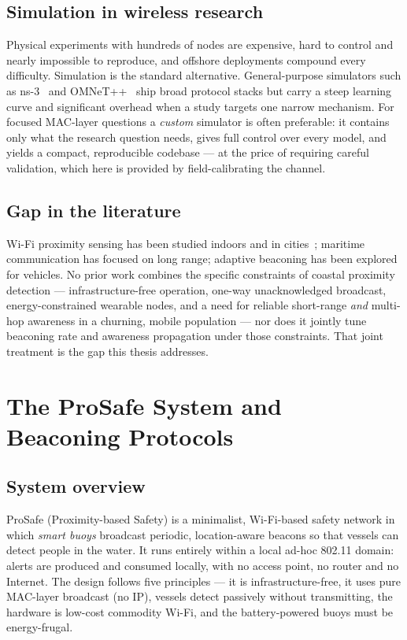 \documentclass[12pt,a4paper,oneside]{report}
\begin{document}
\section{Simulation in wireless research}
Physical experiments with hundreds of nodes are expensive, hard to control and
nearly impossible to reproduce, and offshore deployments compound every
difficulty. Simulation is the standard alternative. General-purpose simulators
such as ns-3~\cite{nsnam} and OMNeT++~\cite{omnetpp} ship broad protocol stacks
but carry a steep learning curve and significant overhead when a study targets
one narrow mechanism. For focused MAC-layer questions a \emph{custom} simulator
is often preferable: it contains only what the research question needs, gives
full control over every model, and yields a compact, reproducible codebase ---
at the price of requiring careful validation, which here is provided by
field-calibrating the channel.

\section{Gap in the literature}
Wi-Fi proximity sensing has been studied indoors and in cities~\cite{goel-wifi};
maritime communication has focused on long range; adaptive beaconing has been
explored for vehicles. No prior work combines the specific constraints of
coastal proximity detection --- infrastructure-free operation, one-way
unacknowledged broadcast, energy-constrained wearable nodes, and a need for
reliable short-range \emph{and} multi-hop awareness in a churning, mobile
population --- nor does it jointly tune beaconing rate and awareness propagation
under those constraints. That joint treatment is the gap this thesis addresses.

\chapter{The ProSafe System and Beaconing Protocols}
\label{ch:system}

\section{System overview}
ProSafe (Proximity-based Safety) is a minimalist, Wi-Fi-based safety network in
which \emph{smart buoys} broadcast periodic, location-aware beacons so that
vessels can detect people in the water. It runs entirely within a local ad-hoc
802.11 domain: alerts are produced and consumed locally, with no access point,
no router and no Internet. The design follows five principles --- it is
infrastructure-free, it uses pure MAC-layer broadcast (no IP), vessels detect
passively without transmitting, the hardware is low-cost commodity Wi-Fi, and
the battery-powered buoys must be energy-frugal.
\end{document}
